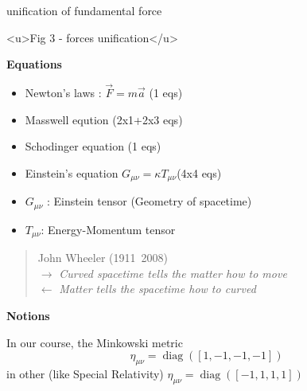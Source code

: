 \documentclass[12pt]{article}
\begin{document}
unification of fundamental force

<u>Fig 3 - forces unification</u>

\textbf{Equations}

\begin{itemize}
	\item Newton's laws : $\vec{F} = m\vec{a}$  (1 eqs)

\end{itemize}
\begin{itemize}
	\item Masswell eqution (2x1+2x3 eqs)

\end{itemize}
\begin{itemize}
	\item Schodinger equation (1 eqs)

\end{itemize}
\begin{itemize}
	\item Einstein's equation $G_{\mu\nu} = \kappa T_{\mu\nu}$​  (4x4 eqs)

\end{itemize}
	\begin{itemize}
		\item $G_{\mu\nu}$ : Einstein tensor (Geometry of spacetime)
		\item $T_{\mu\nu}$​ : Energy-Momentum tensor

	\end{itemize}
\begin{quote}
	John Wheeler (1911~2008)\\
$\longrightarrow$ \textit{Curved spacetime tells the matter how to move}\\
$\longleftarrow$ \textit{Matter tells the spacetime how to curved}
\end{quote}

\textbf{Notions}

In our course, the Minkowski metric
\begin{equation}
\eta_{\mu\nu} = \operatorname{diag}([1,-1,-1,-1])
\end{equation}
in other (like Special Relativity) $\eta_{\mu\nu} = \operatorname{diag}([-1,1,1,1])$




\end{document}
